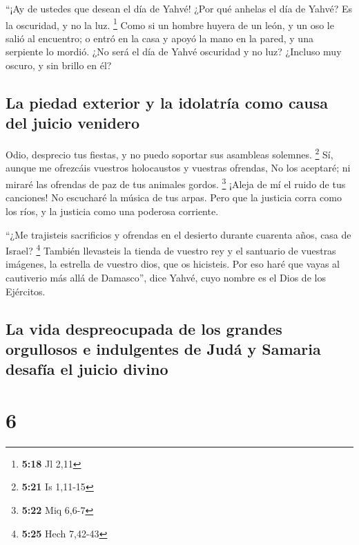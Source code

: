  ``¡Ay de ustedes que desean el día de Yahvé! ¿Por qué
anhelas el día de Yahvé? Es la oscuridad, y no la luz. \footnote{\textbf{5:18}
  Jl 2,11}  Como si un hombre huyera de un león, y un oso
le salió al encuentro; o entró en la casa y apoyó la mano en la pared, y
una serpiente lo mordió.  ¿No será el día de Yahvé
oscuridad y no luz? ¿Incluso muy oscuro, y sin brillo en él?

\hypertarget{la-piedad-exterior-y-la-idolatruxeda-como-causa-del-juicio-venidero}{%
\subsection{La piedad exterior y la idolatría como causa del juicio
venidero}\label{la-piedad-exterior-y-la-idolatruxeda-como-causa-del-juicio-venidero}}

 Odio, desprecio tus fiestas, y no puedo soportar sus
asambleas solemnes. \footnote{\textbf{5:21} Is 1,11-15} 
Sí, aunque me ofrezcáis vuestros holocaustos y vuestras ofrendas, No los
aceptaré; ni miraré las ofrendas de paz de tus animales gordos.
\footnote{\textbf{5:22} Miq 6,6-7}  ¡Aleja de mí el ruido
de tus canciones! No escucharé la música de tus arpas. 
Pero que la justicia corra como los ríos, y la justicia como una
poderosa corriente.

 ``¿Me trajisteis sacrificios y ofrendas en el desierto
durante cuarenta años, casa de Israel? \footnote{\textbf{5:25} Hech
  7,42-43}  También llevasteis la tienda de vuestro rey y
el santuario de vuestras imágenes, la estrella de vuestro dios, que os
hicisteis.  Por eso haré que vayas al cautiverio más allá
de Damasco'', dice Yahvé, cuyo nombre es el Dios de los Ejércitos.

\hypertarget{la-vida-despreocupada-de-los-grandes-orgullosos-e-indulgentes-de-juduxe1-y-samaria-desafuxeda-el-juicio-divino}{%
\subsection{La vida despreocupada de los grandes orgullosos e
indulgentes de Judá y Samaria desafía el juicio
divino}\label{la-vida-despreocupada-de-los-grandes-orgullosos-e-indulgentes-de-juduxe1-y-samaria-desafuxeda-el-juicio-divino}}

\hypertarget{section-5}{%
\section{6}\label{section-5}}

